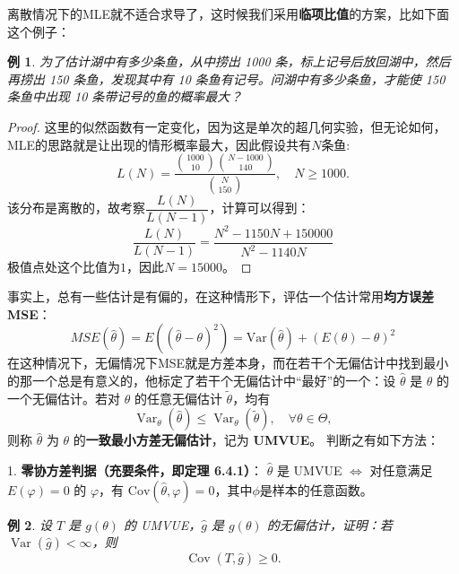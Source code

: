 \documentclass[a4paper]{ctexart}
\newtheorem{example}{例}[section]
\begin{document}
\begin{tipbox}
    离散情况下的MLE就不适合求导了，这时候我们采用\textbf{临项比值}的方案，比如下面这个例子：
    \begin{example}
        为了估计湖中有多少条鱼，从中捞出 1000 条，标上记号后放回湖中，然后再捞出 150 条鱼，发现其中有 10 条鱼有记号。问湖中有多少条鱼，才能使 150 条鱼中出现 10 条带记号的鱼的概率最大？
    \end{example}
    \begin{proof}
        这里的似然函数有一定变化，因为这是单次的超几何实验，但无论如何，MLE的思路就是让出现的情形概率最大，因此假设共有$N$条鱼:
        \begin{equation}
            L(N) = \frac{\binom{1000}{10} \binom{N-1000}{140}}{\binom{N}{150}}, \quad N \geq 1000.
        \end{equation}
        该分布是离散的，故考察$\dfrac{L(N)}{L(N-1)}$，计算可以得到：
        \begin{equation}
            \dfrac{L(N)}{L(N-1)} = \dfrac{N^2-1150N+150000}{N^2-1140N}
        \end{equation}
        极值点处这个比值为$1$，因此$N=15000$。
    \end{proof}
\end{tipbox}
事实上，总有一些估计是有偏的，在这种情形下，评估一个估计常用\textbf{均方误差MSE}：
\begin{equation}
    MSE(\hat{\theta})=E((\hat{\theta}-\theta)^2)=\mathrm{Var}(\hat{\theta})+(E(\theta)-\theta)^2
\end{equation}
在这种情况下，无偏情况下MSE就是方差本身，而在若干个无偏估计中找到最小的那一个总是有意义的，他标定了若干个无偏估计中“最好”的一个：设 \(\hat{\theta}\) 是 \(\theta\) 的一个无偏估计。若对 \(\theta\) 的任意无偏估计 \(\tilde{\theta}\)，均有
\begin{equation}
    \operatorname{Var}_\theta(\hat{\theta}) \le \operatorname{Var}_\theta(\tilde{\theta}), \quad \forall \theta \in \Theta,    
\end{equation}
则称 \(\hat{\theta}\) 为 \(\theta\) 的\textbf{一致最小方差无偏估计}，记为 \textbf{UMVUE}。
判断之有如下方法：

1. \textbf{零协方差判据（充要条件，即定理 6.4.1）}：
   \(\hat{\theta}\) 是 UMVUE \(\iff\) 对任意满足 \(E(\varphi)=0\) 的 \(\varphi\)，有 \(\mathrm{Cov}(\hat{\theta}, \varphi)=0\)，其中$\phi$是样本的任意函数。
\begin{example}
    设 \( T \) 是 \( g(\theta) \) 的 UMVUE，\( \hat{g} \) 是 \( g(\theta) \) 的无偏估计，证明：若 \( \operatorname{Var}(\hat{g}) < \infty \)，则
    \begin{equation}
    \operatorname{Cov}(T, \hat{g}) \geq 0.
    \end{equation}
\end{example}
\end{document}
